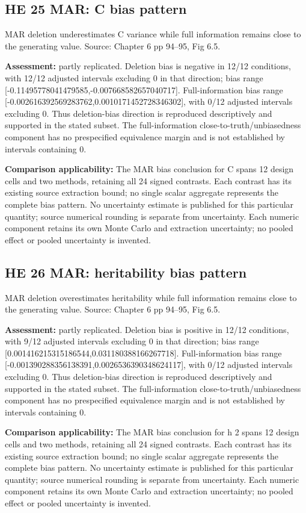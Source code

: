 \documentclass[11pt]{article}
\begin{document}
\subsection{HE 25 MAR: C bias pattern}\label{head:HE25}
MAR deletion underestimates C variance while full information remains close to the generating value. Source: Chapter 6 pp 94--95, Fig 6.5.

\textbf{Assessment:} partly replicated. Deletion bias is negative in 12/12 conditions, with 12/12 adjusted intervals excluding 0 in that direction; bias range [-0.11495778041479585,-0.007668582657040717]. Full-information bias range [-0.002616392569283762,0.0010171452728346302], with 0/12 adjusted intervals excluding 0. Thus deletion-bias direction is reproduced descriptively and supported in the stated subset. The full-information close-to-truth/unbiasedness component has no prespecified equivalence margin and is not established by intervals containing 0.

\textbf{Comparison applicability:} The MAR bias conclusion for C spans 12 design cells and two methods, retaining all 24 signed contrasts. Each contrast has its existing source extraction bound; no single scalar aggregate represents the complete bias pattern. No uncertainty estimate is published for this particular quantity; source numerical rounding is separate from uncertainty. Each numeric component retains its own Monte Carlo and extraction uncertainty; no pooled effect or pooled uncertainty is invented.
\subsection{HE 26 MAR: heritability bias pattern}\label{head:HE26}
MAR deletion overestimates heritability while full information remains close to the generating value. Source: Chapter 6 pp 94--95, Fig 6.5.

\textbf{Assessment:} partly replicated. Deletion bias is positive in 12/12 conditions, with 9/12 adjusted intervals excluding 0 in that direction; bias range [0.001416215315186544,0.031180388166267718]. Full-information bias range [-0.001390288356138391,0.0026536390348624117], with 0/12 adjusted intervals excluding 0. Thus deletion-bias direction is reproduced descriptively and supported in the stated subset. The full-information close-to-truth/unbiasedness component has no prespecified equivalence margin and is not established by intervals containing 0.

\textbf{Comparison applicability:} The MAR bias conclusion for h 2 spans 12 design cells and two methods, retaining all 24 signed contrasts. Each contrast has its existing source extraction bound; no single scalar aggregate represents the complete bias pattern. No uncertainty estimate is published for this particular quantity; source numerical rounding is separate from uncertainty. Each numeric component retains its own Monte Carlo and extraction uncertainty; no pooled effect or pooled uncertainty is invented.
\end{document}
